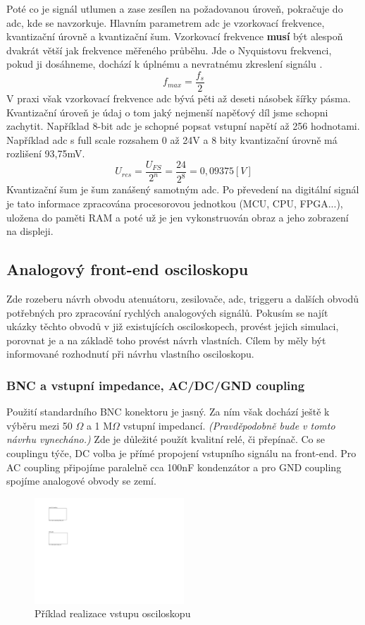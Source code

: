\documentclass[12pt]{article}
\begin{document}
Poté co je signál utlumen
a zase zesílen na požadovanou úroveň, pokračuje do \acrshort{adc}, kde se navzorkuje.
Hlavním parametrem \acrshort{adc} je vzorkovací frekvence, kvantizační úrovně a kvantizační
šum. Vzorkovací frekvence \textbf{musí} být alespoň dvakrát větší jak frekvence měřeného
průběhu. Jde o Nyquistovu frekvenci, pokud ji dosáhneme, dochází k úplnému a nevratnému
zkreslení signálu \cite{AliasingADCsNot2015}. $$f_{max}=\frac{f_s}{2}$$ V praxi však vzorkovací
frekvence \acrshort{adc} bývá pěti až deseti násobek šířky pásma. Kvantizační úroveň je údaj
o tom jaký nejmenší napěťový díl jsme schopni zachytit. Například 8-bit \acrshort{adc} je
schopné popsat vstupní napětí až 256 hodnotami. Například \acrshort{adc} s full scale rozsahem
0 až 24V a 8 bity kvantizační úrovně má rozlišení 93,75mV.
$$U_{res}=\frac{U_{FS}}{2^n}=\frac{24}{2^8}=0, 09375 [V]$$ Kvantizační šum je šum zanášený
samotným \acrshort{adc}. Po převedení na digitální signál je tato informace zpracována
procesorovou jednotkou (MCU, CPU, FPGA...), uložena do paměti RAM a poté už je jen vykonstruován
obraz a jeho zobrazení na displeji.

\subsection{Analogový front-end osciloskopu}

Zde rozeberu návrh obvodu atenuátoru, zesilovače, \acrshort{adc}, triggeru a dalších obvodů
potřebných pro zpracování rychlých analogových signálů. Pokusím se najít ukázky těchto obvodů
v již existujících osciloskopech, provést jejich simulaci, porovnat je a na základě toho
provést návrh vlastních. Cílem by měly být informované rozhodnutí při návrhu vlastního osciloskopu.

\subsubsection{BNC a vstupní impedance, AC/DC/GND coupling}

Použití standardního BNC konektoru je jasný. Za ním však dochází ještě k výběru mezi 50 $\Omega$ a 1 M$\Omega$
vstupní impedancí. \emph{(Pravděpodobně bude v tomto návrhu vynecháno.)} Zde je důležité použít
kvalitní relé, či přepínač. Co se couplingu týče,
DC volba je přímé propojení vstupního signálu na front-end. Pro AC coupling připojíme paralelně cca
100nF kondenzátor a pro GND coupling spojíme analogové obvody se zemí.

\begin{figure}[h]
    \centering
    \includegraphics[width=0.5\textwidth, page=2]{kicad-export}
    \caption{Příklad realizace vstupu osciloskopu}
    \label{fig:input-example}
\end{figure}
\end{document}
